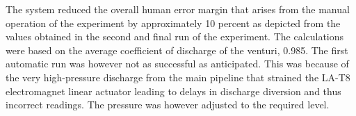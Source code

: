 \par
The system reduced the overall human error margin that arises from the manual operation of the experiment by approximately 10 percent as depicted from the values obtained in the second and final run of the experiment. The calculations were based on the average coefficient of discharge of the venturi, 0.985. The first automatic run was however not as successful as anticipated. This was because of the very high-pressure discharge from the main pipeline that strained the LA-T8 electromagnet linear actuator leading to delays in discharge diversion and thus incorrect readings. The pressure was however adjusted to the required level.